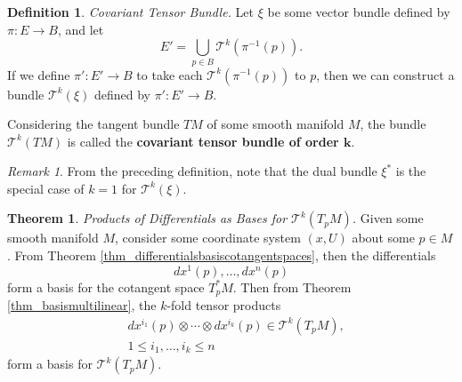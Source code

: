 \documentclass[10pt,landscape]{article}
\theoremstyle{definition}
\newtheorem{definition}{Definition}[section]
\theoremstyle{theorem}
\newtheorem{theorem}{Theorem}[section]
\theoremstyle{summary}
\theoremstyle{remark}
\newtheorem*{remark}{Remark}
\begin{document}
\begin{multicols*}{3}
\theoremstyle{definition}
\begin{definition}{\textit{Covariant Tensor Bundle.}}
    Let $\xi$ be some vector bundle defined by $\pi: E\rightarrow B$, and let
    \begin{equation}
        E'=\bigcup\limits_{p\in B}\mathcal{T}^k\left(\pi^{-1}(p)\right).
    \end{equation}
    If we define $\pi':E'\rightarrow B$ to take each $\mathcal{T}^k\left(\pi^{-1}(p)\right)$ to $p$, then we can construct a bundle $\mathcal{T}^k(\xi)$ defined by $\pi':E'\rightarrow B$.

    Considering the tangent bundle $TM$ of some smooth manifold $M$, the bundle $\mathcal{T}^k(TM)$ is called the \textbf{covariant tensor bundle of order $\bm{k}$}.
\end{definition}

\begin{remark}
    From the preceding definition, note that the dual bundle $\xi^*$ is the special case of $k=1$ for $\mathcal{T}^k(\xi)$.
\end{remark}

\theoremstyle{theorem}
\begin{theorem}{\textit{Products of Differentials as Bases for $\mathcal{T}^k(T_pM)$.}}
    \label{thm_basesforcovariantspacepoint}
    Given some smooth manifold $M$, consider some coordinate system $(x ,U)$ about some $p\in M$. From Theorem \ref{thm_differentialsbasiscotangentspaces}, then the differentials
    \begin{equation}
        dx^1(p), \ldots, dx^n(p)
    \end{equation}
    form a basis for the cotangent space $T_p^*M$. Then from Theorem \ref{thm_basismultilinear}, the $k$-fold tensor products
    \begin{align}
        & dx^{i_1}(p)\otimes\cdots\otimes dx^{i_k}(p)\in\mathcal{T}^k(T_pM),\\
        & 1\leq i_1,\ldots,i_k\leq n
    \end{align}
    form a basis for $\mathcal{T}^k(T_pM)$.
\end{theorem}


\end{multicols*}
\end{document}
